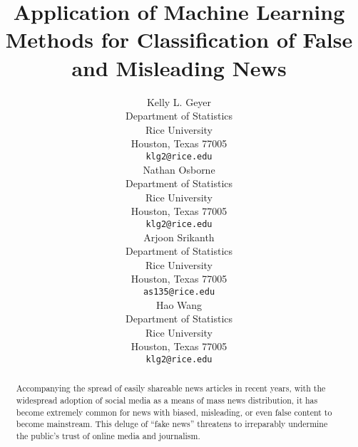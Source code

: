 \documentclass{article}
\title{Application of Machine Learning Methods for Classification of False and Misleading News}
\author{
  Kelly L. Geyer\\
  Department of Statistics\\
  Rice University\\
  Houston, Texas 77005 \\
  \texttt{klg2@rice.edu} \\
  \And
  Nathan Osborne \\
  Department of Statistics\\
  Rice University\\
  Houston, Texas 77005 \\
  \texttt{klg2@rice.edu} \\
  \And
  Arjoon Srikanth \\
  Department of Statistics\\
  Rice University\\
  Houston, Texas 77005 \\
  \texttt{as135@rice.edu} \\
  \And
  Hao Wang \\
  Department of Statistics\\
  Rice University\\
  Houston, Texas 77005 \\
  \texttt{klg2@rice.edu} \\
}
\begin{document}

\maketitle

\begin{abstract}
 
 
Accompanying the spread of easily shareable news articles in recent years, with the widespread adoption of social media as a means of mass news distribution, it has become extremely common for news with biased, misleading, or even false content to become mainstream. This deluge of “fake news” threatens to irreparably undermine the public’s trust of online media and journalism. 


\end{abstract}
\end{document}
